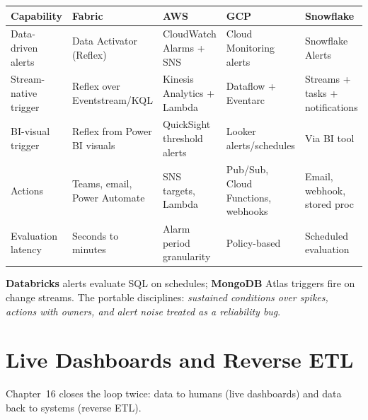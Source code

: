 \begin{center}
\footnotesize
\begin{tabular}{@{}p{2.8cm}p{3.2cm}p{3.2cm}p{3.2cm}p{3.2cm}@{}}
\toprule
\textbf{Capability} & \textbf{Fabric} & \textbf{AWS} & \textbf{GCP} & \textbf{Snowflake} \\
\midrule
Data-driven alerts & Data Activator (Reflex) & CloudWatch Alarms + SNS & Cloud Monitoring alerts & Snowflake Alerts \\
Stream-native trigger & Reflex over Eventstream/KQL & Kinesis Analytics + Lambda & Dataflow + Eventarc & Streams + tasks + notifications \\
BI-visual trigger & Reflex from Power BI visuals & QuickSight threshold alerts & Looker alerts/schedules & Via BI tool \\
Actions & Teams, email, Power Automate & SNS targets, Lambda & Pub/Sub, Cloud Functions, webhooks & Email, webhook, stored proc \\
Evaluation latency & Seconds to minutes & Alarm period granularity & Policy-based & Scheduled evaluation \\
\bottomrule
\end{tabular}
\end{center}

\noindent \textbf{Databricks} alerts evaluate SQL on schedules; \textbf{MongoDB} Atlas triggers
fire on change streams. The portable disciplines: \emph{sustained conditions over spikes,
actions with owners, and alert noise treated as a reliability bug}.

\section{Live Dashboards and Reverse ETL}
%
Chapter~16 closes the loop twice: data to humans (live dashboards) and data back to systems
(reverse ETL).

